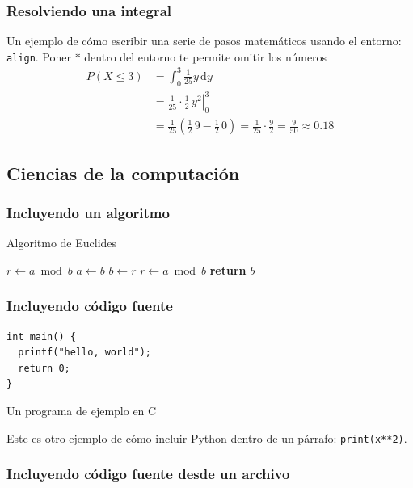 \documentclass{beamer}
\begin{document}
\begin{frame}
\frametitle{Resolviendo una integral}
Un ejemplo de cómo escribir una serie de pasos matemáticos usando el entorno: \texttt{align}.
Poner $*$ dentro del entorno te permite omitir los números
\begin{align*}
P\left(X \leq 3 \right) &= \int_{0}^{3} \frac{1}{25} y \,\mathrm{d}y \\
     &= \left. \frac{1}{25} \cdot \frac{1}{2} \, y^{2} \right|_0^3 \\
     &= \frac{1}{25} \left( \frac{1}{2} \, 9 - \frac{1}{2} \, 0 \right) =
     \frac{1}{25} \cdot \frac{9}{2} = \frac{9}{50} \approx 0.18 
\end{align*}
\end{frame}

\subsection{Ciencias de la computación}
\begin{frame}
\frametitle{Incluyendo un algoritmo}
\begin{algorithm}[H]
\caption{Algoritmo de Euclides}
\label{alg:euclid}
\begin{algorithmic}[1] %
     
    \State $r\gets a \bmod b$
     
        \State $a \gets b$
        \State $b \gets r$
        \State $r \gets a \bmod b$
    \EndWhile\label{euclidendwhile}
    \State \textbf{return} $b$
    \EndProcedure
\end{algorithmic}
\end{algorithm}

\end{frame}

\begin{frame}[fragile] %
\frametitle{Incluyendo código fuente}
\begin{listing}
\begin{verbatim}
int main() {
  printf("hello, world");
  return 0;
}
\end{verbatim}
\caption{Un programa de ejemplo en C}\label{lst:hello}
\end{listing}

Este es otro ejemplo de cómo incluir Python dentro de un párrafo: \texttt{print(x**2)}.

\end{frame}

\begin{frame}[fragile] %
\frametitle{Incluyendo código fuente desde un archivo}
\end{frame}
\end{document}
